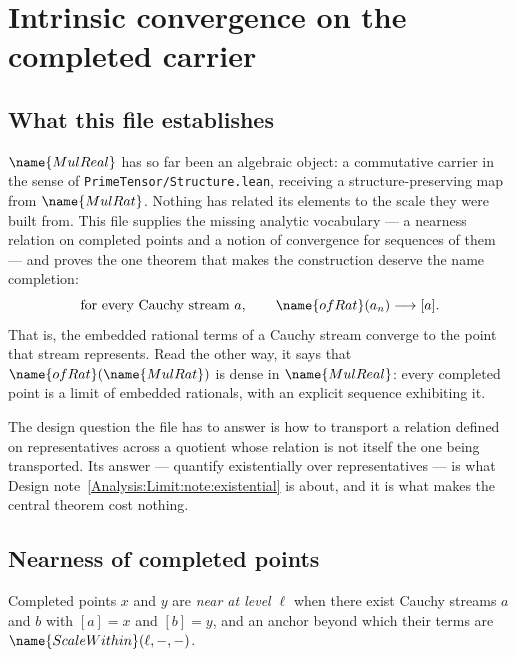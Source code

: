 
\section{Intrinsic convergence on the completed carrier}
\label{Analysis:Limit:sec}


\subsection*{What this file establishes}

$\name{MulReal}$ has so far been an algebraic object: a commutative carrier in
the sense of \texttt{PrimeTensor/Structure.lean}, receiving a
structure-preserving map from $\name{MulRat}$.  Nothing has related its
elements to the scale they were built from.  This file supplies the missing
analytic vocabulary --- a nearness relation on completed points and a notion of
convergence for sequences of them --- and proves the one theorem that makes the
construction deserve the name completion:
\[
  \text{for every Cauchy stream } a, \qquad
  \name{ofRat}(a_n) \longrightarrow [a] .
\]
That is, the embedded rational terms of a Cauchy stream converge to the point
that stream represents.  Read the other way, it says that
$\name{ofRat}(\name{MulRat})$ is dense in $\name{MulReal}$: every completed
point is a limit of embedded rationals, with an explicit sequence exhibiting it.

The design question the file has to answer is how to transport a relation
defined on representatives across a quotient whose relation is not itself the
one being transported.  Its answer --- quantify existentially over
representatives --- is what
Design note~\ref{Analysis:Limit:note:existential} is about, and it is what
makes the central theorem cost nothing.

\subsection{Nearness of completed points}

\begin{definition}\label{Analysis:Limit:def:scalenear}
Completed points $x$ and $y$ are \emph{near at level $\ell$} when there exist
Cauchy streams $a$ and $b$ with $[a] = x$ and $[b] = y$, and an anchor beyond
which their terms are $\name{ScaleWithin}(\ell,-,-)$.
\end{definition}

